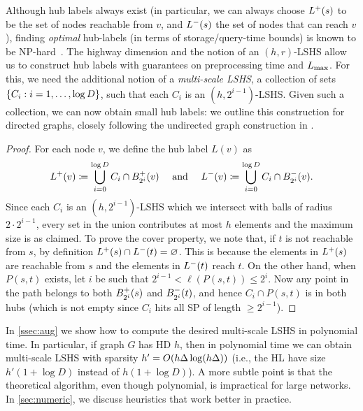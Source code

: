 Although hub labels always exist (in particular, we can always choose $\Lf(s)$ to be the set of nodes reachable from $v$, and $\Lb(s)$ the set of nodes that can reach $v$), finding \emph{optimal} hub-labels (in terms of storage/query-time bounds) is known to be NP-hard~\cite{babenko_hl_complexity}.
The highway dimension and the notion of an $(h,r)$-LSHS allow us to construct hub labels with guarantees on preprocessing time and $\Lm$. For this, we need the additional notion of a \emph{multi-scale LSHS}, a collection of sets $\crl*{C_i: i=1,\ldots,\log D}$, such that each $C_i$ is an $(h,2^{i-1})$-LSHS.
Given such a collection, we can now obtain small hub labels: we outline this construction for directed graphs, closely following the undirected graph construction in \cite[Theorem 5.1]{highway2013}.
\begin{proof}
	For each node $v$, we define the hub label $L(v)$ as
	\[
	\Lf(v)\defeq  \bigcup_{i=0}^{\log D}C_i\cap \Bf_{2^i}(v) \quad\text{ and }\quad
	\Lb(v)\defeq \bigcup_{i=0}^{\log D}C_i\cap \Bb_{2^i}(v).
	\]
	Since each $C_i$ is an $(h,2^{i-1})$-LSHS which we intersect with balls of radius $2\cdot 2^{i-1}$, every set in the union contributes at most $h$ elements and the maximum size is as claimed.
	To prove the cover property, we note that, if $t$ is not reachable from $s$, by definition $\Lf(s)\cap\Lb(t)=\varnothing$.
	This is because the elements in $\Lf(s)$ are reachable from $s$ and the elements in $\Lb(t)$ reach $t$.
	On the other hand, when $P(s,t)$ exists, let $i$ be such that $2^{i-1}<\ell(P(s,t))\leq 2^i$.
	Now any point in the path belongs to both $\Bf_{2^i}(s)$ and $\Bb_{2^i}(t)$, and hence $C_i\cap P(s,t)$ is in both hubs (which is not empty since $C_i$ hits all SP of length $\geq 2^{i-1}$).
\end{proof}



In \cref{ssec:aug} we show how to compute the desired multi-scale LSHS in polynomial time. In particular, if graph $G$ has HD $h$, then in polynomial time we can obtain multi-scale LSHS with sparsity $h'=\Or(h\Delta\log(h\Delta))$ (i.e., the HL have size $h'(1+\log D)$ instead of $h(1+\log D)$).
A more subtle point is that the theoretical algorithm, even though polynomial, is impractical for large networks.
In \cref{sec:numeric}, we discuss heuristics that work better in practice.
